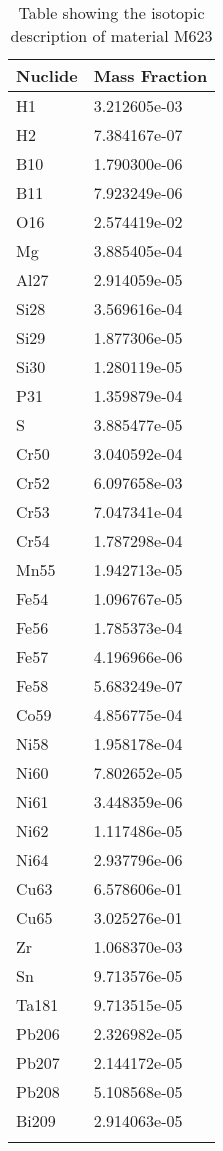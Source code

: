 \begin{centering}
\begin{longtable}[ht!]
{ p{} | p{} }
\hline
Nuclide & Mass Fraction\\
\hline
H1 & 3.212605e-03\\
H2 & 7.384167e-07\\
B10 & 1.790300e-06\\
B11 & 7.923249e-06\\
O16 & 2.574419e-02\\
Mg & 3.885405e-04\\
Al27 & 2.914059e-05\\
Si28 & 3.569616e-04\\
Si29 & 1.877306e-05\\
Si30 & 1.280119e-05\\
P31 & 1.359879e-04\\
S & 3.885477e-05\\
Cr50 & 3.040592e-04\\
Cr52 & 6.097658e-03\\
Cr53 & 7.047341e-04\\
Cr54 & 1.787298e-04\\
Mn55 & 1.942713e-05\\
Fe54 & 1.096767e-05\\
Fe56 & 1.785373e-04\\
Fe57 & 4.196966e-06\\
Fe58 & 5.683249e-07\\
Co59 & 4.856775e-04\\
Ni58 & 1.958178e-04\\
Ni60 & 7.802652e-05\\
Ni61 & 3.448359e-06\\
Ni62 & 1.117486e-05\\
Ni64 & 2.937796e-06\\
Cu63 & 6.578606e-01\\
Cu65 & 3.025276e-01\\
Zr & 1.068370e-03\\
Sn & 9.713576e-05\\
Ta181 & 9.713515e-05\\
Pb206 & 2.326982e-05\\
Pb207 & 2.144172e-05\\
Pb208 & 5.108568e-05\\
Bi209 & 2.914063e-05\\

\caption{Table showing the isotopic description of material M623}
\label{table:material_M623}
\end{longtable}\clearpage


\end{centering}
